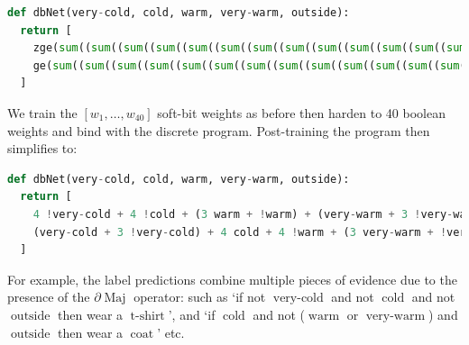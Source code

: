 \documentclass{article} %
\begin{document}
\begin{lstlisting}[language=Python,style=mystyle,frame=single]
def dbNet(very-cold, cold, warm, very-warm, outside):
  return [
    zge(sum((sum((sum((sum((sum((sum((sum((sum((sum((sum((sum((sum((sum((sum((sum((sum((sum((sum((sum((sum((0, not(xor(ne(very-cold, 0), w1)))), not(xor(ne(cold, 0), w2)))), not(xor(ne(warm, 0), w3)))), not(xor(ne(very-warm, 0), w4)))), not(xor(ne(outside, 0), w5)))), not(xor(ne(very-cold, 0), w6)))), not(xor(ne(cold, 0), w7)))), not(xor(ne(warm, 0), w8)))), not(xor(ne(very-warm, 0), w9)))), not(xor(ne(outside, 0), w10)))), not(xor(ne(very-cold, 0), w11)))), not(xor(ne(cold, 0), w12)))), not(xor(ne(warm, 0), w13)))), not(xor(ne(very-warm, 0), w14)))), not(xor(ne(outside, 0), w15)))), not(xor(ne(very-cold, 0), w16)))), not(xor(ne(cold, 0), w17)))), not(xor(ne(warm, 0), w18)))), not(xor(ne(very-warm, 0), w19)))), not(xor(ne(outside, 0), w20)))), 11),
    ge(sum((sum((sum((sum((sum((sum((sum((sum((sum((sum((sum((sum((sum((sum((sum((sum((sum((sum((sum((sum((0, not(xor(ne(very-cold, 0), w21)))), not(xor(ne(cold, 0), w22)))), not(xor(ne(warm, 0), w23)))), not(xor(ne(very-warm, 0), w24)))), not(xor(ne(outside, 0), w25)))), not(xor(ne(very-cold, 0), w26)))), not(xor(ne(cold, 0), w27)))), not(xor(ne(warm, 0), w28)))), not(xor(ne(very-warm, 0), w29)))), not(xor(ne(outside, 0), w30)))), not(xor(ne(very-cold, 0), w31)))), not(xor(ne(cold, 0), w32)))), not(xor(ne(warm, 0), w33)))), not(xor(ne(very-warm, 0), w34)))), not(xor(ne(outside, 0), w35)))), not(xor(ne(very-cold, 0), w36)))), not(xor(ne(cold, 0), w37)))), not(xor(ne(warm, 0), w38)))), not(xor(ne(very-warm, 0), w39)))), not(xor(ne(outside, 0), w40)))), 11)
  ]
\end{lstlisting}
We train the $[w_{1}, \dots, w_{40}]$ soft-bit weights as before then harden to 40 boolean weights and bind with the discrete program. Post-training the program then simplifies to:

\begin{lstlisting}[language=Python,style=mystyle,frame=single]
def dbNet(very-cold, cold, warm, very-warm, outside):
  return [
    4 !very-cold + 4 !cold + (3 warm + !warm) + (very-warm + 3 !very-warm) + (outside + 3 !outside) >= 11,
    (very-cold + 3 !very-cold) + 4 cold + 4 !warm + (3 very-warm + !very-warm) + 2 (outside + !outside) >= 11
  ]
\end{lstlisting}

For example, the label predictions combine multiple pieces of evidence due to the presence of the $\partial\!\operatorname{Maj}$ operator: such as `if not $\operatorname{very-cold}$ and not $\operatorname{cold}$ and not $\operatorname{outside}$ then wear a $\operatorname{t-shirt}$', and `if $\operatorname{cold}$ and not ($\operatorname{warm}$ or $\operatorname{very-warm}$) and $\operatorname{outside}$ then wear a $\operatorname{coat}$' etc.
\end{document}
